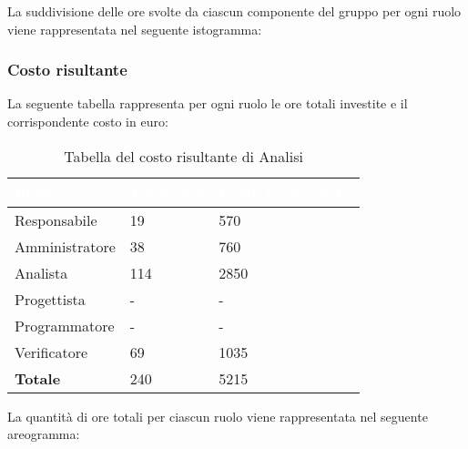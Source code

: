 La suddivisione delle ore svolte da ciascun componente del gruppo per ogni ruolo viene rappresentata nel seguente istogramma:
\begin{center}
	\pgfplotsset{width=17cm, height=8.5cm}
\end{center}
\clearpage

\subsubsection{Costo risultante}
La seguente tabella rappresenta per ogni ruolo le ore totali investite e il corrispondente costo in euro:
{
\renewcommand{\arraystretch}{2}
\begin{longtable}{ C{3cm} C{2cm} C{4cm}}
\caption{Tabella del costo risultante di Analisi}\\

\textcolor{white}{\textbf{Ruolo}} & 
\textcolor{white}{\textbf{Totale ore}} & 
\textcolor{white}{\textbf{Costo ruolo (in \euro{})}}\\	
\endhead

Responsabile    &  19 &  570 \\
Amministratore  &  38 &  760 \\
Analista        & 114 & 2850 \\
Progettista     &   - &    - \\
Programmatore   &   - &    - \\
Verificatore    &  69 & 1035 \\
\textbf{Totale} & 240 & 5215 \\
		
\end{longtable}
}

La quantità di ore totali per ciascun ruolo viene rappresentata nel seguente areogramma:
\begin{center}
\end{center}